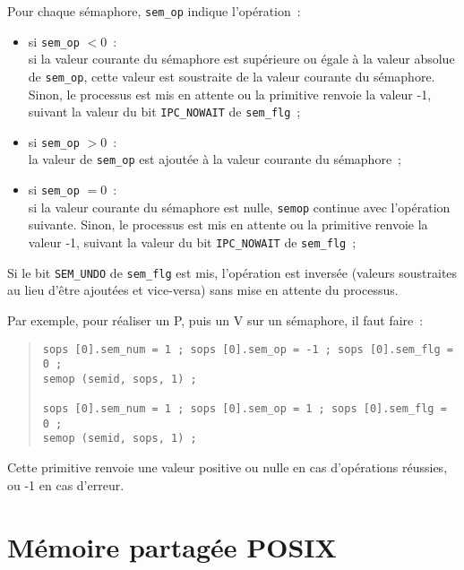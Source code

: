 \documentclass [twoside] {report}
\begin{document}
Pour chaque sémaphore, \texttt {sem\_op} indique l'opération~:

\begin {itemize}
    \item si \texttt {sem\_op} $< 0$~:\\
	si la valeur courante du sémaphore est supérieure ou égale à la valeur
	absolue de \texttt {sem\_op}, cette valeur est soustraite de la
	valeur courante du sémaphore. Sinon, le processus est mis en
	attente ou la primitive renvoie la valeur -1, suivant la valeur
	du bit \texttt {IPC\_NOWAIT} de \texttt {sem\_flg}~;

    \item si \texttt {sem\_op} $> 0$~:\\
	la valeur de \texttt {sem\_op} est ajoutée à la valeur courante du
	sémaphore~;

    \item si \texttt {sem\_op} $= 0$~:\\
	si la valeur courante du sémaphore est nulle, \texttt {semop}
	continue avec l'opération suivante. Sinon, le processus est mis
	en attente ou la primitive renvoie la valeur -1, suivant la
	valeur du bit \texttt {IPC\_NOWAIT} de \texttt {sem\_flg}~;
\end {itemize}

Si le bit \texttt {SEM\_UNDO} de \texttt {sem\_flg} est mis, l'opération est
inversée (valeurs soustraites au lieu d'être ajoutées et vice-versa)
sans mise en attente du processus.

Par exemple, pour réaliser un P, puis un V sur un sémaphore, il faut
faire~:

\begin {quote}
\small
\begin {verbatim}
sops [0].sem_num = 1 ; sops [0].sem_op = -1 ; sops [0].sem_flg = 0 ;
semop (semid, sops, 1) ;

sops [0].sem_num = 1 ; sops [0].sem_op = 1 ; sops [0].sem_flg = 0 ;
semop (semid, sops, 1) ;
\end{verbatim}
\end {quote}

Cette primitive renvoie une valeur positive ou nulle en cas
d'opérations réussies, ou -1 en cas d'erreur.



\section {Mémoire partagée POSIX}
\end{document}
